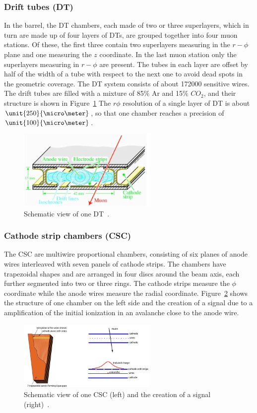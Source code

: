 \subsubsection*{Drift tubes (DT)}
In the barrel, the DT chambers, each made of two or three superlayers, which in turn are made up of four layers of DTs, are grouped together into four muon stations. Of these, the first three contain two superlayers measuring in the $r-\phi$ plane and one measuring the $z$ coordinate. In the last muon station only the superlayers measuring in $r-\phi$ are present. The tubes in each layer are offset by half of the width of a tube with respect to the next one to avoid dead spots in the geometric coverage. The DT system consists of about 172000 sensitive wires. The drift tubes are filled with a mixture of 85\% Ar and 15\% $CO_2$, and their structure is shown in Figure~\ref{fig:DT} The $r\phi$ resolution of a single layer of DT is about $\unit{250}{\micro\meter}$, so that one chamber reaches a precision of $\unit{100}{\micro\meter}$.
\begin{figure}[htbp]
\centering
  \includegraphics[width=0.6\textwidth]{plots/CMS/DT.png}
\caption{Schematic view of one DT~\cite{CMS}.}
\label{fig:DT}
\end{figure}  
\subsubsection*{Cathode strip chambers (CSC)}
The CSC are multiwire proportional chambers, consisting of six planes of anode wires interleaved with seven panels of cathode strips. The chambers have trapezoidal shapes and are arranged in four discs around the beam axis, each further segmented into two or three rings. The cathode strips measure the $\phi$ coordinate while the anode wires measure the radial coordinate. Figure~\ref{fig:CSC} shows the structure of one chamber on the left side and the creation of a signal due to a amplification of the initial ionization in an avalanche close to the anode wire. 
\begin{figure}[htbp]
\centering
  \includegraphics[width=0.6\textwidth]{plots/CMS/CSC.png}
\caption{Schematic view of one CSC (left) and the creation of a signal (right)~\cite{CMS}.}
\label{fig:CSC}
\end{figure}  
